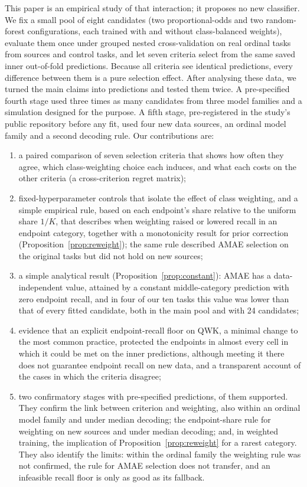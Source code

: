 \documentclass[pdflatex,sn-mathphys-ay]{sn-jnl}
\theoremstyle{thmstyleone}
\theoremstyle{thmstylethree}
\begin{document}
This paper is an empirical study of that interaction; it proposes no new classifier. We fix a small pool of eight candidates (two proportional-odds and two random-forest configurations, each trained with and without class-balanced weights), evaluate them once under grouped nested cross-validation on \NPrimary{} real ordinal tasks from \NFamiliesPrimary{} sources and \NControls{} control tasks, and let seven criteria select from the same saved inner out-of-fold predictions. Because all criteria see identical predictions, every difference between them is a pure selection effect. After analysing these data, we turned the main claims into predictions and tested them twice. A pre-specified fourth stage used three times as many candidates from three model families and a simulation designed for the purpose. A fifth stage, pre-registered in the study's public repository before any fit, used four new data sources, an ordinal model family and a second decoding rule. Our contributions are:
\begin{enumerate}
\item a paired comparison of seven selection criteria that shows how often they agree, which class-weighting choice each induces, and what each costs on the other criteria (a cross-criterion regret matrix);
\item fixed-hyperparameter controls that isolate the effect of class weighting, and a simple empirical rule, based on each endpoint's share relative to the uniform share $1/K$, that describes when weighting raised or lowered recall in an endpoint category, together with a monotonicity result for prior correction (Proposition~\ref{prop:reweight}); the same rule described AMAE selection on the original tasks but did not hold on new sources;
\item a simple analytical result (Proposition~\ref{prop:constant}): AMAE has a data-independent value, attained by a constant middle-category prediction with zero endpoint recall, and in four of our ten tasks this value was lower than that of every fitted candidate, both in the main pool and with 24 candidates;
\item evidence that an explicit endpoint-recall floor on QWK, a minimal change to the most common practice, protected the endpoints in almost every cell in which it could be met on the inner predictions, although meeting it there does not guarantee endpoint recall on new data, and a transparent account of the cases in which the criteria disagree;
\item two confirmatory stages with \PredAllN{} pre-specified predictions, \PredAllOk{} of them supported. They confirm the link between criterion and weighting, also within an ordinal model family and under median decoding; the endpoint-share rule for weighting on new sources and under median decoding; and, in weighted training, the implication of Proposition~\ref{prop:reweight} for a rarest category. They also identify the limits: within the ordinal family the weighting rule was not confirmed, the rule for AMAE selection does not transfer, and an infeasible recall floor is only as good as its fallback.
\end{enumerate}
\end{document}
